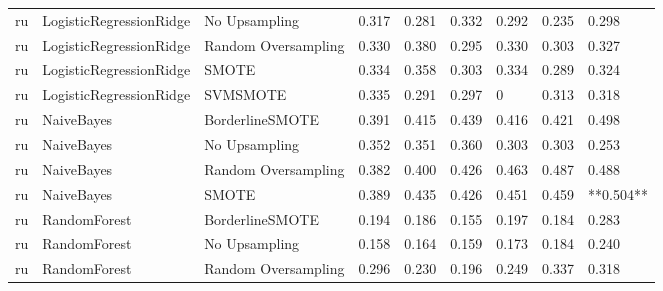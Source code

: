 \begin{tabular}{lllllllll}
      ru &      LogisticRegressionRidge &       No Upsampling & 0.317 &                     0.281 &                 0.332 &                  0.292 &                                   0.235 &     0.298 \\
      ru &      LogisticRegressionRidge & Random Oversampling & 0.330 &                     0.380 &                 0.295 &                  0.330 &                                   0.303 &     0.327 \\
      ru &      LogisticRegressionRidge &               SMOTE & 0.334 &                     0.358 &                 0.303 &                  0.334 &                                   0.289 &     0.324 \\
      ru &      LogisticRegressionRidge &            SVMSMOTE & 0.335 &                     0.291 &                 0.297 &                      0 &                                   0.313 &     0.318 \\
      ru &                   NaiveBayes &     BorderlineSMOTE & 0.391 &                     0.415 &                 0.439 &                  0.416 &                                   0.421 &     0.498 \\
      ru &                   NaiveBayes &       No Upsampling & 0.352 &                     0.351 &                 0.360 &                  0.303 &                                   0.303 &     0.253 \\
      ru &                   NaiveBayes & Random Oversampling & 0.382 &                     0.400 &                 0.426 &                  0.463 &                                   0.487 &     0.488 \\
      ru &                   NaiveBayes &               SMOTE & 0.389 &                     0.435 &                 0.426 &                  0.451 &                                   0.459 & **0.504** \\
      ru &                 RandomForest &     BorderlineSMOTE & 0.194 &                     0.186 &                 0.155 &                  0.197 &                                   0.184 &     0.283 \\
      ru &                 RandomForest &       No Upsampling & 0.158 &                     0.164 &                 0.159 &                  0.173 &                                   0.184 &     0.240 \\
      ru &                 RandomForest & Random Oversampling & 0.296 &                     0.230 &                 0.196 &                  0.249 &                                   0.337 &     0.318 \\

\end{tabular}
